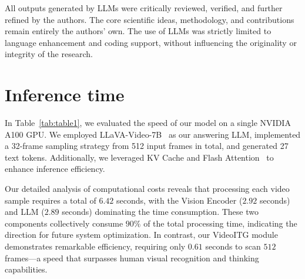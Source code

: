 All outputs generated by LLMs were critically reviewed, verified, and further refined by the authors. The core scientific ideas, methodology, and contributions remain entirely the authors’ own. The use of LLMs was strictly limited to language enhancement and coding support, without influencing the originality or integrity of the research.

\section{Inference time}
In Table~\ref{tab:table1}, we evaluated the speed of our model on a single NVIDIA A100 GPU. We employed LLaVA-Video-7B~\cite{zhang2024video} as our answering LLM, implemented a 32-frame sampling strategy from 512 input frames in total, and generated 27 text tokens. Additionally, we leveraged KV Cache and Flash Attention~\cite{dao2022flashattention, dao2023flashattention2} to enhance inference efficiency.

Our detailed analysis of computational costs reveals that processing each video sample requires a total of $6.42$ seconds, with the Vision Encoder ($2.92$ seconds) and LLM ($2.89$ seconds) dominating the time consumption. These two components collectively consume $90\%$ of the total processing time, indicating the direction for future system optimization. In contrast, our VideoITG module demonstrates remarkable efficiency, requiring only $0.61$ seconds to scan $512$ frames—a speed that surpasses human visual recognition and thinking capabilities.

\begin{table}[ht]
  \centering
\end{table}



\begin{table}[t]
\centering
\caption{Dataset quality (IoU). We evaluate the performance in both multiple-choice (MC) and open-ended (OE) questions.}
\label{tab:ablate_dataset}\vspace{2mm}
\end{table}

